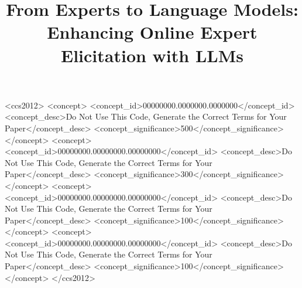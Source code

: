\documentclass[manuscript,review,anonymous]{acmart}
\begin{document}


\title{From Experts to Language Models: Enhancing Online Expert Elicitation with LLMs}

\begin{abstract}


\end{abstract}

\begin{CCSXML}
<ccs2012>
 <concept>
  <concept_id>00000000.0000000.0000000</concept_id>
  <concept_desc>Do Not Use This Code, Generate the Correct Terms for Your Paper</concept_desc>
  <concept_significance>500</concept_significance>
 </concept>
 <concept>
  <concept_id>00000000.00000000.00000000</concept_id>
  <concept_desc>Do Not Use This Code, Generate the Correct Terms for Your Paper</concept_desc>
  <concept_significance>300</concept_significance>
 </concept>
 <concept>
  <concept_id>00000000.00000000.00000000</concept_id>
  <concept_desc>Do Not Use This Code, Generate the Correct Terms for Your Paper</concept_desc>
  <concept_significance>100</concept_significance>
 </concept>
 <concept>
  <concept_id>00000000.00000000.00000000</concept_id>
  <concept_desc>Do Not Use This Code, Generate the Correct Terms for Your Paper</concept_desc>
  <concept_significance>100</concept_significance>
 </concept>
</ccs2012>
\end{CCSXML}



\clearpage
\maketitle
\end{document}
